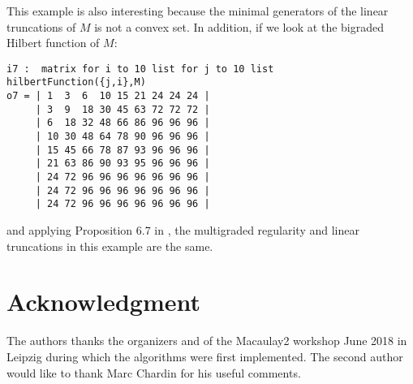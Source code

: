 \documentclass[11pt]{amsart}
\theoremstyle{definition}
\begin{document}
This example is also interesting because the minimal generators of the linear truncations of $M$ is not a convex set. In addition, if we look at the bigraded Hilbert function of $M$:
\begin{footnotesize}
 \begin{verbatim}
i7 :  matrix for i to 10 list for j to 10 list hilbertFunction({j,i},M)
o7 = | 1  3  6  10 15 21 24 24 24 |
     | 3  9  18 30 45 63 72 72 72 |
     | 6  18 32 48 66 86 96 96 96 |
     | 10 30 48 64 78 90 96 96 96 |
     | 15 45 66 78 87 93 96 96 96 |
     | 21 63 86 90 93 95 96 96 96 |
     | 24 72 96 96 96 96 96 96 96 |
     | 24 72 96 96 96 96 96 96 96 |
     | 24 72 96 96 96 96 96 96 96 |
\end{verbatim}
\end{footnotesize}
and applying Proposition 6.7 in \cite{MaclagenSmith}, the multigraded regularity and linear truncations in this example are the same.


\section{Acknowledgment}
The authors thanks the organizers and of the Macaulay2 workshop June 2018 in Leipzig during which the algorithms were first implemented. The second author would like to thank Marc Chardin for his useful comments.




\end{document}
